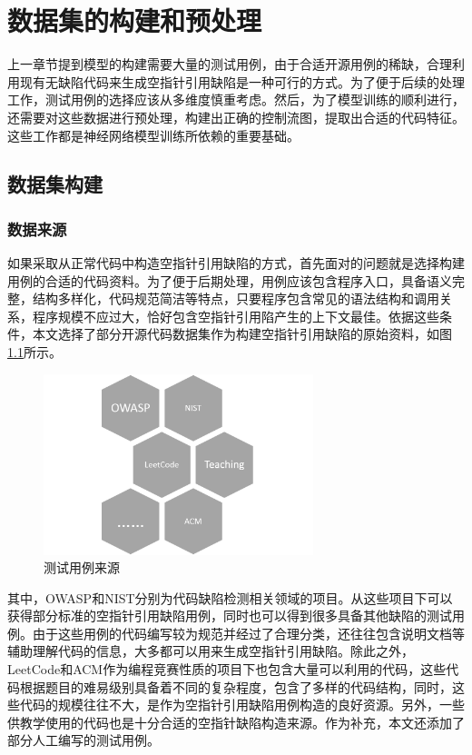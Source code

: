 \chapter{数据集的构建和预处理}

上一章节提到模型的构建需要大量的测试用例，由于合适开源用例的稀缺，合理利用现有无缺陷代码来生成空指针引用缺陷是一种可行的方式。为了便于后续的处理工作，测试用例的选择应该从多维度慎重考虑。然后，为了模型训练的顺利进行，还需要对这些数据进行预处理，构建出正确的控制流图，提取出合适的代码特征。这些工作都是神经网络模型训练所依赖的重要基础。

\section{数据集构建}
\subsection{数据来源}
如果采取从正常代码中构造空指针引用缺陷的方式，首先面对的问题就是选择构建用例的合适的代码资料。为了便于后期处理，用例应该包含程序入口，具备语义完整，结构多样化，代码规范简洁等特点，只要程序包含常见的语法结构和调用关系，程序规模不应过大，恰好包含空指针引用陷产生的上下文最佳。依据这些条件，本文选择了部分开源代码数据集作为构建空指针引用缺陷的原始资料，如图\ref{fig:figure4-1}所示。

\begin{figure}
	\centering
	\includegraphics[width=0.70\textwidth]{figures/resource4-1}
	\caption{测试用例来源}\label{fig:figure4-1}
\end{figure}

其中，OWASP和NIST分别为代码缺陷检测相关领域的项目。从这些项目下可以获得部分标准的空指针引用缺陷用例，同时也可以得到很多具备其他缺陷的测试用例。由于这些用例的代码编写较为规范并经过了合理分类，还往往包含说明文档等辅助理解代码的信息，大多都可以用来生成空指针引用缺陷。除此之外，LeetCode和ACM作为编程竞赛性质的项目下也包含大量可以利用的代码，这些代码根据题目的难易级别具备着不同的复杂程度，包含了多样的代码结构，同时，这些代码的规模往往不大，是作为空指针引用缺陷用例构造的良好资源。另外，一些供教学使用的代码也是十分合适的空指针缺陷构造来源。作为补充，本文还添加了部分人工编写的测试用例。

